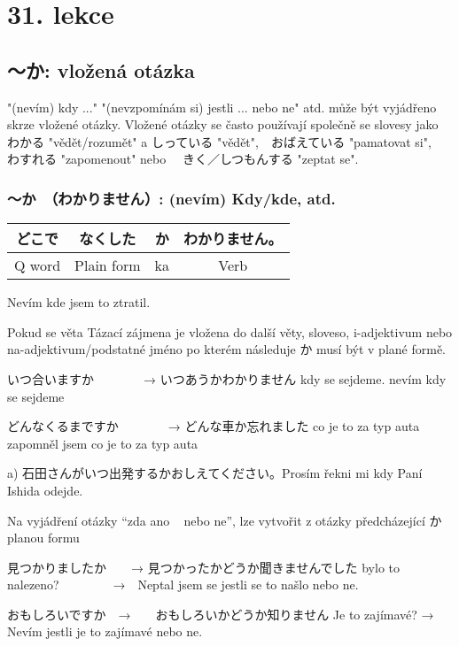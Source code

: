 \section{31. lekce}
\label{sec:lekce_31}

\subsection{〜か: vložená otázka}

"(nevím) kdy ..." "(nevzpomínám si) jestli ... nebo ne" atd. může být vyjádřeno skrze vložené otázky. Vložené otázky se často používají společně se slovesy jako わかる "vědět/rozumět" a しっている "vědět",　おばえている "pamatovat si",　わすれる "zapomenout" nebo 　きく／しつもんする "zeptat se".

\subsubsection{〜か　（わかりません）: (nevím) Kdy/kde, atd.}

\begin{center}
\begin{tabular}{||c||c|c||c||}
\hline
どこで&なくした&か&わかりません。\\
\hline
Q word&Plain form&ka&Verb\\
\hline
\end{tabular}
\end{center}
Nevím kde jsem to ztratil.

Pokud se věta Tázací zájmena je vložena do další věty, sloveso, i-adjektivum nebo na-adjektivum/podstatné jméno po kterém následuje か musí být v plané formě.

いつ合いますか　　　　→          いつあうかわかりません
kdy se sejdeme.    				nevím kdy se sejdeme

どんなくるまですか　　　　→        どんな車か忘れました
co je to za typ auta				zapomněl jsem co je to za typ auta



a) 石田さんがいつ出発するかおしえてください。Prosím řekni mi kdy Paní Ishida odejde.


Na vyjádření otázky  “zda ano ~ nebo ne”, lze vytvořit z otázky předcházející  か planou formu

見つかりましたか　　→  見つかったかどうか聞きませんでした
bylo to nalezeno?  　　　　→　Neptal jsem se jestli se to našlo nebo ne.


おもしろいですか　→　　おもしろいかどうか知りません
Je to zajímavé? → Nevím jestli je to zajímavé nebo ne.



